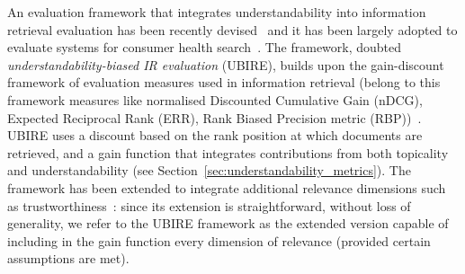 
An evaluation framework that integrates understandability into information retrieval evaluation has been recently devised~\cite{zuccon14,zuccon16} and it has been largely adopted to evaluate systems for consumer health search~\cite{clefIR15,clefIR16,clefIR17}. The framework, doubted \textit{understandability-biased IR evaluation} (UBIRE), builds upon the gain-discount framework of evaluation measures used in information retrieval (belong to this framework measures like normalised Discounted Cumulative Gain (nDCG), Expected Reciprocal Rank (ERR), Rank Biased Precision metric (RBP))~\cite{carterette11}. UBIRE uses a discount based on the rank position at which documents are retrieved, and a gain function that integrates contributions from both topicality and understandability (see Section~\ref{sec:understandability_metrics}). The framework has been extended to integrate additional relevance dimensions such as trustworthiness~\cite{clefIR17}: since its extension is straightforward, without loss of generality, we refer to the UBIRE framework as the extended version capable of including in the gain function every dimension of relevance (provided certain assumptions are met). 

